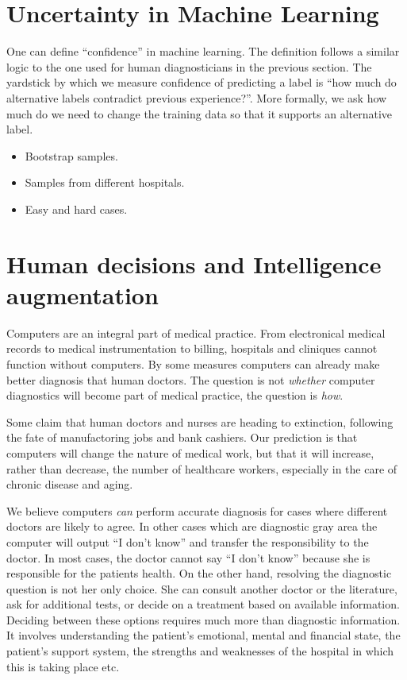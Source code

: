 \documentclass[11pt]{article}
\begin{document}
    
\section*{Uncertainty in Machine Learning}

One can define ``confidence'' in machine learning. The definition follows a
similar logic to the one used for human diagnosticians in the previous
section. The yardstick by which we measure confidence of predicting a
label is ``how much do alternative labels contradict previous
experience?''.
More formally, we ask how much do we need to change the training data
so that it supports an alternative label.




\begin{itemize}
  \item Bootstrap samples.
  \item Samples from different hospitals.
  \item Easy and hard cases.
  \end{itemize}

  \section*{Human decisions and Intelligence augmentation}

  Computers are an integral part of medical practice. From
  electronical medical records to medical instrumentation to billing,
  hospitals and cliniques cannot function without computers. By some
  measures computers can already make better diagnosis that human
  doctors. The question is not {\em whether} computer diagnostics will
  become part of medical practice, the question is {\em how}.

  Some claim that human doctors and nurses are heading to extinction,
  following the fate of manufactoring jobs and bank cashiers.  Our prediction is
  that computers will change the nature of medical work, but that it
  will increase, rather than decrease, the number of healthcare
  workers, especially in the care of chronic disease and aging.

  We believe computers {\em can} perform accurate diagnosis for cases where
  different doctors are likely to agree. In other cases which are
  diagnostic gray area the computer will output ``I don't know'' and
  transfer the responsibility to the doctor. In most cases, the doctor
  cannot say ``I don't know'' because she is responsible for the
  patients health. On the other hand, resolving the diagnostic
  question is not her only choice. She can consult another doctor or
  the literature, ask for additional tests, or decide on a treatment
  based on available information. Deciding between these options requires much
  more than diagnostic information. It involves understanding the
  patient's emotional, mental and financial state, the patient's
  support system, the strengths and weaknesses of the hospital in
  which this is taking place etc.
\end{document}
